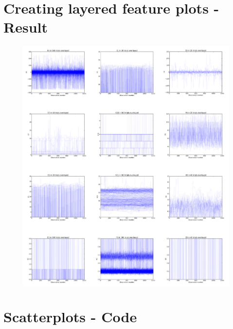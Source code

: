 \section{Creating layered feature plots - Result} %
\label{app:result-layered-feature-plots}
\begin{figure}[hb]
    \centering
    \includegraphics[width=.9\textwidth]{media/layered-plots-sheet.pdf}
    \caption{}
\end{figure}

\clearpage

\section{Scatterplots - Code} %
\label{app:source-scatterplots}

\clearpage

